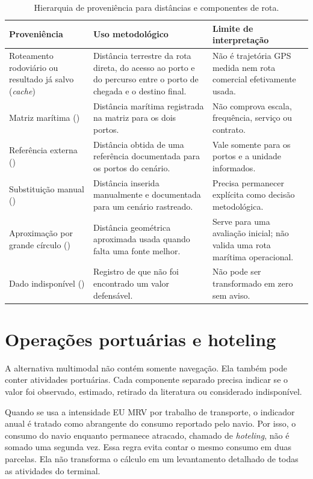 \begin{table}[htbp]
\centering
\small
\caption{Hierarquia de proveniência para distâncias e componentes de rota.}
\label{tab:app-proveniencia-distancias}
\begin{tabularx}{\textwidth}{L{0.24\textwidth}Y Y}
\toprule
Proveniência & Uso metodológico & Limite de interpretação \\
\midrule
Roteamento rodoviário ou resultado já salvo (\emph{cache}) & Distância terrestre da rota direta, do acesso ao porto e do percurso entre o porto de chegada e o destino final. & Não é trajetória GPS medida nem rota comercial efetivamente usada.\\
Matriz marítima () & Distância marítima registrada na matriz para os dois portos. & Não comprova escala, frequência, serviço ou contrato.\\
Referência externa () & Distância obtida de uma referência documentada para os portos do cenário. & Vale somente para os portos e a unidade informados.\\
Substituição manual () & Distância inserida manualmente e documentada para um cenário rastreado. & Precisa permanecer explícita como decisão metodológica.\\
Aproximação por grande círculo () & Distância geométrica aproximada usada quando falta uma fonte melhor. & Serve para uma avaliação inicial; não valida uma rota marítima operacional.\\
Dado indisponível () & Registro de que não foi encontrado um valor defensável. & Não pode ser transformado em zero sem aviso.\\
\bottomrule
\end{tabularx}
\end{table}

\section{Operações portuárias e hoteling}
\label{sec:app-portops-hoteling}

A alternativa multimodal não contém somente navegação. Ela também pode conter atividades portuárias. Cada componente separado precisa indicar se o valor foi observado, estimado, retirado da literatura ou considerado indisponível.

Quando se usa a intensidade EU MRV por trabalho de transporte, o indicador anual é tratado como abrangente do consumo reportado pelo navio. Por isso, o consumo do navio enquanto permanece atracado, chamado de \emph{hoteling}, não é somado uma segunda vez. Essa regra evita contar o mesmo consumo em duas parcelas. Ela não transforma o cálculo em um levantamento detalhado de todas as atividades do terminal.

